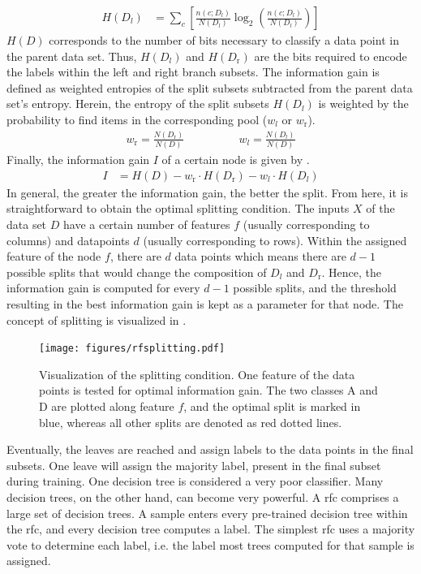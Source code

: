 \begin{align}\label{eq:entropy}
H(D_{l}) & = \sum_{c} \left[\frac{n(c;D_{l})}{N(D_{l})} \log _{2}\left( \frac{n(c;D_{l})}{N(D_{l})} \right)\right]
\end{align}\noindent
$H(D)$ corresponds to the number of bits necessary to classify a data point in the parent data set. Thus, $H(D_{l})$ and $H(D_\text{r})$ are the bits required to encode the labels within the left and right branch subsets. The information gain is defined as weighted entropies of the split subsets subtracted from the parent data set's entropy. Herein, the entropy of the split subsets $H(D_{l})$ is weighted by the probability to find items in the corresponding pool ($w_{l}$ or $w_\text{r}$).\cite{Forsyth2019}
\begin{align}\label{eq:weightentropy}
w_\text{r}  = \frac{N(D_\text{r})}{N(D)} \qquad \qquad &
w_{l} = \frac{N(D_{l})}{N(D)}
\end{align}\noindent
Finally, the information gain $I$ of a certain node is given by .\cite{Forsyth2019}
\begin{align}\label{eq:infogain}
I & = H(D) - w_\text{r}\cdot H(D_\text{r}) - w_{l}\cdot H(D_{l})
\end{align}
In general, the greater the information gain, the better the split. From here, it is straightforward to obtain the optimal splitting condition. The inputs $X$ of the data set $D$ have a certain number of features $f$ (usually corresponding to columns) and datapoints $d$ (usually corresponding to rows). Within the assigned feature of the node $f$, there are $d$ data points which means there are $d-1$ possible splits that would change the composition of $D_{l}$ and $D_\text{r}$. Hence, the information gain is computed for every $d-1$ possible splits, and the threshold resulting in the best information gain is kept as a parameter for that node.\cite{Forsyth2019} The concept of splitting is visualized in .
\begin{figure}[H]
	\centering
	\texttt{[image: figures/rfsplitting.pdf]}
	\caption[Visualization of the Splitting Condition]{Visualization of the splitting condition. One feature of the data points is tested for optimal information gain. The two classes A and D are plotted along feature $f$, and the optimal split is marked in blue, whereas all other splits are denoted as red dotted lines.}
	\label{fig:rfsplitting}
\end{figure}\noindent
Eventually, the leaves are reached and assign labels to the data points in the final subsets. One leave will assign the majority label, present in the final subset during training. One decision tree is considered a very poor classifier. Many decision trees, on the other hand, can become very powerful. A \ac{rfc} comprises a large set of decision trees. A sample enters every pre-trained decision tree within the \ac{rfc}, and every decision tree computes a label. The simplest \ac{rfc} uses a majority vote to determine each label, i.e. the label most trees computed for that sample is assigned.\cite{Forsyth2019}\\
